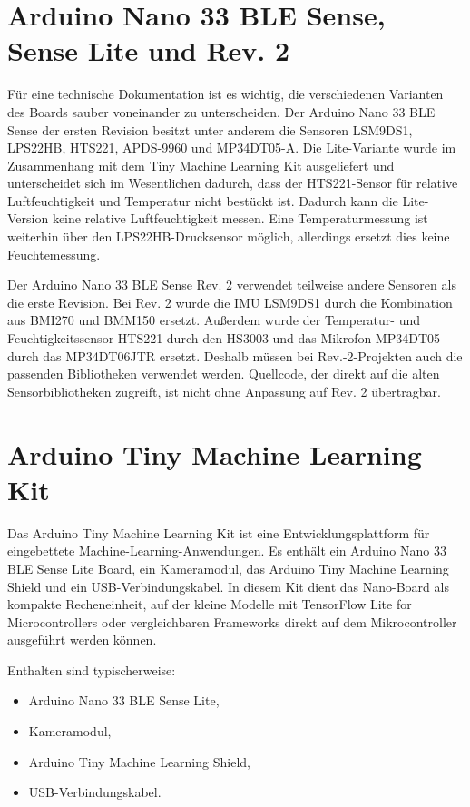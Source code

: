 \section{Arduino Nano 33 BLE Sense, Sense Lite und Rev. 2}

Für eine technische Dokumentation ist es wichtig, die verschiedenen Varianten des Boards sauber voneinander zu unterscheiden. Der Arduino Nano 33 BLE Sense der ersten Revision besitzt unter anderem die Sensoren LSM9DS1, LPS22HB, HTS221, APDS-9960 und MP34DT05-A. Die Lite-Variante wurde im Zusammenhang mit dem Tiny Machine Learning Kit ausgeliefert und unterscheidet sich im Wesentlichen dadurch, dass der HTS221-Sensor für relative Luftfeuchtigkeit und Temperatur nicht bestückt ist. Dadurch kann die Lite-Version keine relative Luftfeuchtigkeit messen. Eine Temperaturmessung ist weiterhin über den LPS22HB-Drucksensor möglich, allerdings ersetzt dies keine Feuchtemessung.

Der Arduino Nano 33 BLE Sense Rev. 2 verwendet teilweise andere Sensoren als die erste Revision. Bei Rev. 2 wurde die IMU LSM9DS1 durch die Kombination aus BMI270 und BMM150 ersetzt. Außerdem wurde der Temperatur- und Feuchtigkeitssensor HTS221 durch den HS3003 und das Mikrofon MP34DT05 durch das MP34DT06JTR ersetzt. Deshalb müssen bei Rev.-2-Projekten auch die passenden Bibliotheken verwendet werden. Quellcode, der direkt auf die alten Sensorbibliotheken zugreift, ist nicht ohne Anpassung auf Rev. 2 übertragbar.

\section{Arduino Tiny Machine Learning Kit}

Das Arduino Tiny Machine Learning Kit ist eine Entwicklungsplattform für eingebettete Machine-Learning-Anwendungen. Es enthält ein Arduino Nano 33 BLE Sense Lite Board, ein Kameramodul, das Arduino Tiny Machine Learning Shield und ein USB-Verbindungskabel. In diesem Kit dient das Nano-Board als kompakte Recheneinheit, auf der kleine Modelle mit TensorFlow Lite for Microcontrollers oder vergleichbaren Frameworks direkt auf dem Mikrocontroller ausgeführt werden können.

Enthalten sind typischerweise:
\begin{itemize}
	\item Arduino Nano 33 BLE Sense Lite,
	\item Kameramodul,
	\item Arduino Tiny Machine Learning Shield,
	\item USB-Verbindungskabel.
\end{itemize}

